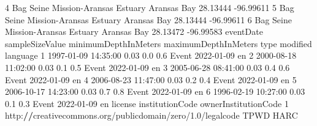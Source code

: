 \documentclass[
]{book}
\newenvironment{Shaded}{\begin{snugshade}}{\end{snugshade}}
\newcommand{\DecValTok}[1]{\textcolor[rgb]{0.00,0.00,0.81}{#1}}
\newcommand{\ErrorTok}[1]{\textcolor[rgb]{0.64,0.00,0.00}{\textbf{#1}}}
\newcommand{\FloatTok}[1]{\textcolor[rgb]{0.00,0.00,0.81}{#1}}
\newcommand{\NormalTok}[1]{#1}
\newcommand{\SpecialCharTok}[1]{\textcolor[rgb]{0.00,0.00,0.00}{#1}}
\begin{document}
\begin{Shaded}
\begin{Highlighting}[]
\DecValTok{4}\NormalTok{        Bag Seine Mission}\SpecialCharTok{{-}}\NormalTok{Aransas Estuary Aransas Bay        }\FloatTok{28.13444}        \SpecialCharTok{{-}}\FloatTok{96.99611}
\DecValTok{5}\NormalTok{        Bag Seine Mission}\SpecialCharTok{{-}}\NormalTok{Aransas Estuary Aransas Bay        }\FloatTok{28.13444}        \SpecialCharTok{{-}}\FloatTok{96.99611}
\DecValTok{6}\NormalTok{        Bag Seine Mission}\SpecialCharTok{{-}}\NormalTok{Aransas Estuary Aransas Bay        }\FloatTok{28.13472}        \SpecialCharTok{{-}}\FloatTok{96.99583}
\NormalTok{            eventDate sampleSizeValue minimumDepthInMeters maximumDepthInMeters  type   modified language}
\DecValTok{1} \DecValTok{1997{-}01{-}09} \DecValTok{14}\SpecialCharTok{:}\DecValTok{35}\SpecialCharTok{:}\DecValTok{00}            \FloatTok{0.03}                  \FloatTok{0.0}                  \FloatTok{0.6}\NormalTok{ Event }\DecValTok{2022{-}01{-}09}\NormalTok{       en}
\DecValTok{2} \DecValTok{2000{-}08{-}18} \DecValTok{11}\SpecialCharTok{:}\DecValTok{02}\SpecialCharTok{:}\DecValTok{00}            \FloatTok{0.03}                  \FloatTok{0.1}                  \FloatTok{0.5}\NormalTok{ Event }\DecValTok{2022{-}01{-}09}\NormalTok{       en}
\DecValTok{3} \DecValTok{2005{-}06{-}28} \DecValTok{08}\SpecialCharTok{:}\DecValTok{41}\SpecialCharTok{:}\DecValTok{00}            \FloatTok{0.03}                  \FloatTok{0.4}                  \FloatTok{0.6}\NormalTok{ Event }\DecValTok{2022{-}01{-}09}\NormalTok{       en}
\DecValTok{4} \DecValTok{2006{-}08{-}23} \DecValTok{11}\SpecialCharTok{:}\DecValTok{47}\SpecialCharTok{:}\DecValTok{00}            \FloatTok{0.03}                  \FloatTok{0.2}                  \FloatTok{0.4}\NormalTok{ Event }\DecValTok{2022{-}01{-}09}\NormalTok{       en}
\DecValTok{5} \DecValTok{2006{-}10{-}17} \DecValTok{14}\SpecialCharTok{:}\DecValTok{23}\SpecialCharTok{:}\DecValTok{00}            \FloatTok{0.03}                  \FloatTok{0.7}                  \FloatTok{0.8}\NormalTok{ Event }\DecValTok{2022{-}01{-}09}\NormalTok{       en}
\DecValTok{6} \DecValTok{1996{-}02{-}19} \DecValTok{10}\SpecialCharTok{:}\DecValTok{27}\SpecialCharTok{:}\DecValTok{00}            \FloatTok{0.03}                  \FloatTok{0.1}                  \FloatTok{0.3}\NormalTok{ Event }\DecValTok{2022{-}01{-}09}\NormalTok{       en}
\NormalTok{                                                     license institutionCode ownerInstitutionCode}
\DecValTok{1}\NormalTok{ http}\SpecialCharTok{:}\ErrorTok{//}\NormalTok{creativecommons.org}\SpecialCharTok{/}\NormalTok{publicdomain}\SpecialCharTok{/}\NormalTok{zero}\SpecialCharTok{/}\FloatTok{1.0}\SpecialCharTok{/}\NormalTok{legalcode            TPWD                 HARC}

\end{Highlighting}
\end{Shaded}
\end{document}
